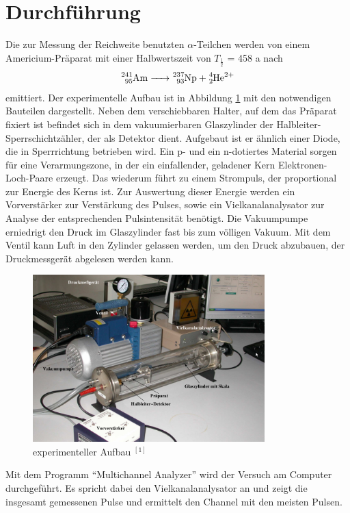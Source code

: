 \section{Durchführung}
Die zur Messung der Reichweite benutzten $\alpha$-Teilchen werden von einem Americium-Präparat mit einer Halbwertszeit von $T_\frac12$ = 
458 a nach 
\begin{align}
 \ce{^{241}_{95}Am} \ce{->} \ce{^{237}_{93}Np} + \ce{^{4}_{2}He^{2+}}
\end{align}
emittiert. Der experimentelle Aufbau ist in Abbildung \ref{pic_aufbau} mit den notwendigen Bauteilen dargestellt. Neben dem verschiebbaren
Halter, auf dem das Präparat fixiert ist befindet sich in dem vakuumierbaren Glaszylinder der Halbleiter-Sperrschichtzähler, der als Detektor
dient. Aufgebaut ist er ähnlich einer Diode, die in Sperrrichtung betrieben wird. Ein p- und ein n-dotiertes Material sorgen für eine 
Verarmungszone, in der ein einfallender, geladener Kern Elektronen-Loch-Paare erzeugt. Das wiederum führt zu einem Strompuls, der proportional
zur Energie des Kerns ist. Zur Auswertung dieser Energie werden ein Vorverstärker zur Verstärkung des Pulses, sowie ein Vielkanalanalysator
zur Analyse der entsprechenden Pulsintensität benötigt. Die Vakuumpumpe erniedrigt den Druck im Glaszylinder fast bis zum völligen Vakuum.
Mit dem Ventil kann Luft in den Zylinder gelassen werden, um den Druck abzubauen, der Druckmessgerät abgelesen werden kann.


\begin{figure}[H]
 \includegraphics[width=0.8\textwidth]{pics/aufbau.png}
 \caption{experimenteller Aufbau $^{[1]}$}
 \label{pic_aufbau}
\end{figure}

Mit dem Programm ``Multichannel Analyzer'' wird der Versuch am Computer durchgeführt. Es spricht dabei den Vielkanalanalysator an und
zeigt die insgesamt gemessenen Pulse und ermittelt den Channel mit den meisten Pulsen.



